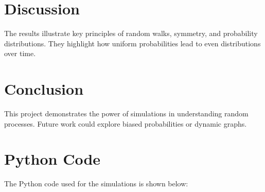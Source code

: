\documentclass[a4paper,11pt]{amsart}
\begin{document}
\section{Discussion}
The results illustrate key principles of random walks, symmetry, and probability distributions. They highlight how uniform probabilities lead to even distributions over time.

\section{Conclusion}
This project demonstrates the power of simulations in understanding random processes. Future work could explore biased probabilities or dynamic graphs.

\appendix
\section{Python Code}
The Python code used for the simulations is shown below:

\end{document}
